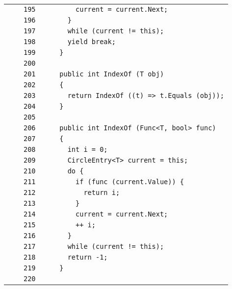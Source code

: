 \documentclass[a4paper,10pt]{article}
\begin{document}
\begin{longtable}[l]{lrrl}
\cellcolor{gray} &  & \verb~195~ & \verb~        current = current.Next;~\\
\cellcolor{gray} &  & \verb~196~ & \verb~      }~\\
\cellcolor{gray} &  & \verb~197~ & \verb~      while (current != this);~\\
\cellcolor{gray} &  & \verb~198~ & \verb~      yield break;~\\
\cellcolor{gray} &  & \verb~199~ & \verb~    }~\\
\cellcolor{gray} &  & \verb~200~ & \verb~~\\
\cellcolor{gray} &  & \verb~201~ & \verb~    public int IndexOf (T obj)~\\
\cellcolor{gray} &  & \verb~202~ & \verb~    {~\\
\cellcolor{gray} &  & \verb~203~ & \verb~      return IndexOf ((t) => t.Equals (obj));~\\
\cellcolor{gray} &  & \verb~204~ & \verb~    }~\\
\cellcolor{gray} &  & \verb~205~ & \verb~~\\
\cellcolor{gray} &  & \verb~206~ & \verb~    public int IndexOf (Func<T, bool> func)~\\
\cellcolor{gray} &  & \verb~207~ & \verb~    {~\\
\cellcolor{gray} &  & \verb~208~ & \verb~      int i = 0;~\\
\cellcolor{gray} &  & \verb~209~ & \verb~      CircleEntry<T> current = this;~\\
\cellcolor{gray} &  & \verb~210~ & \verb~      do {~\\
\cellcolor{gray} &  & \verb~211~ & \verb~        if (func (current.Value)) {~\\
\cellcolor{gray} &  & \verb~212~ & \verb~          return i;~\\
\cellcolor{gray} &  & \verb~213~ & \verb~        }~\\
\cellcolor{gray} &  & \verb~214~ & \verb~        current = current.Next;~\\
\cellcolor{gray} &  & \verb~215~ & \verb~        ++ i;~\\
\cellcolor{gray} &  & \verb~216~ & \verb~      }~\\
\cellcolor{gray} &  & \verb~217~ & \verb~      while (current != this);~\\
\cellcolor{gray} &  & \verb~218~ & \verb~      return -1;~\\
\cellcolor{gray} &  & \verb~219~ & \verb~    }~\\
\cellcolor{gray} &  & \verb~220~ & \verb~~\\

\end{longtable}
\end{document}
